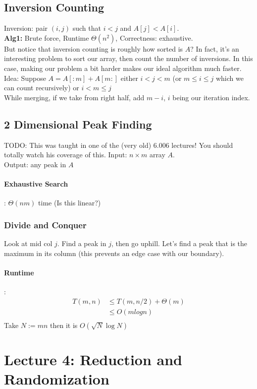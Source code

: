 \documentclass[11pt]{article}
\begin{document}
\subsection{Inversion Counting}
Inversion: pair $(i,j)$ such that $i < j$ and $A[j]<A[i]$. \\
\textbf{Alg1:} Brute force, Runtime $\Theta(n^2)$, Correctness: exhaustive. \\
But notice that inversion counting is roughly how sorted is $A$? In fact, it's an interesting problem to sort our array, then count the number of inversions. In this case, making our problem a bit harder makes our ideal algorithm much faster. \\
Idea: Suppose $A=A[:m]+A[m:]$ either $i<j<m$ (or $m\leq i \leq j$ which we can count recursively) or $i<m\leq j$ \\
While merging, if we take from right half, add $m-i$, $i$ being our iteration index.

\subsection{2 Dimensional Peak Finding}
TODO: This was taught in one of the (very old) 6.006 lectures! You should totally watch his coverage of this.
Input: $n \times m$ array $A$. \\
Output: any peak in $A$
\paragraph{Exhaustive Search}: $\Theta(nm)$ time (Is this linear?)

\subsubsection{Divide and Conquer}
Look at mid col $j$. Find a peak in $j$, then go uphill. Let's find a peak that is the maximum in its column (this prevents an edge case with our boundary).

\paragraph{Runtime}:
\begin{align*}
    T(m,n) &\leq T(m,n/2)+ \Theta(m) \\
           &\leq O(mlogn) \\
\end{align*}
Take $N:=mn$ then it is $O(\sqrt{N}\log N)$

\section{Lecture 4: Reduction and Randomization}
\end{document}
